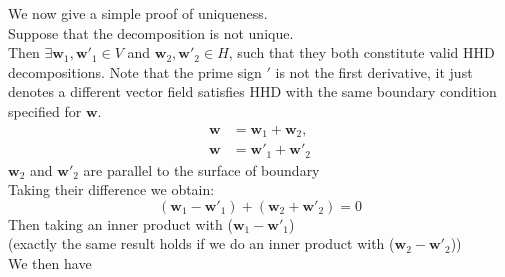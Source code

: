 We now give a simple proof of uniqueness.\\
Suppose that the decomposition is not unique. \\
Then $\exists \textbf{w}_1, \textbf{w}'_1 \in V$ and $\textbf{w}_2, \textbf{w}'_2 \in H$, such that they both constitute valid HHD decompositions. Note that the prime sign $'$ is not the first derivative, it just denotes a different vector field satisfies HHD with the same boundary condition specified for $\textbf{w}$.
\begin{align*}
\textbf{w} &= \textbf{w}_1 + \textbf{w}_2, \\
\textbf{w} & = \textbf{w}'_1 + \textbf{w}'_2
\end{align*}
$\textbf{w}_2$ and $\textbf{w}'_2$ are parallel to the surface of boundary\\
Taking their difference we obtain:
\begin{equation}
(\textbf{w}_1 - \textbf{w}'_1) + (\textbf{w}_2 + \textbf{w}'_2) = 0
\end{equation}
Then taking an inner product with ($\textbf{w}_1 - \textbf{w}'_1$) \\
(exactly the same result holds if we do an inner product with ($\textbf{w}_2 - \textbf{w}'_2$))\\
We then have

